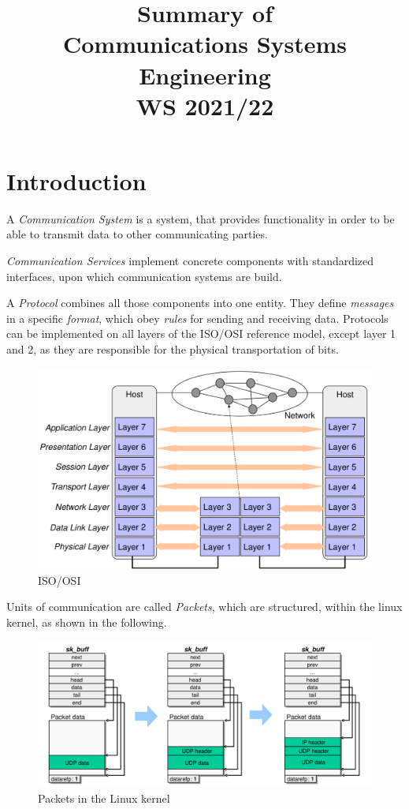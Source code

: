 \documentclass[english]{panikzettel}
\title{{\small Summary of} \\ Communications Systems Engineering \\ {\small WS 2021/22}}
\begin{document}
	\maketitle
	\setcounter{tocdepth}{2}
	\tableofcontents

	\newpage
	\section{Introduction}
	\label{s-introduction}
	
	A \textit{Communication System} is a system, that provides functionality in order to be able to transmit data to other communicating parties.

	\textit{Communication Services} implement concrete components with standardized interfaces, upon which communication systems are build.

	A \textit{Protocol} combines all those components into one entity.
	They define \textit{messages} in a specific \textit{format}, which obey \textit{rules} for sending and receiving data.
	Protocols can be implemented on all layers of the ISO/OSI reference model, except layer 1 and 2, as they are responsible for the physical transportation of bits.

	\begin{figure}[H]
		\centering
		\includegraphics[width=\textwidth]{img/0-iso-osi.png}
		\caption{ISO/OSI}
		\label{img-0-iso-osi}
	\end{figure}
	
	Units of communication are called \textit{Packets}, which are structured, within the linux kernel, as shown in the following.

	\begin{figure}[H]
		\centering
		\includegraphics[width=\textwidth]{img/0-paket-kernel-rep.png}
		\caption{Packets in the Linux kernel}
		\label{img-0-paket-kernel-rep}
	\end{figure}
	
\end{document}
